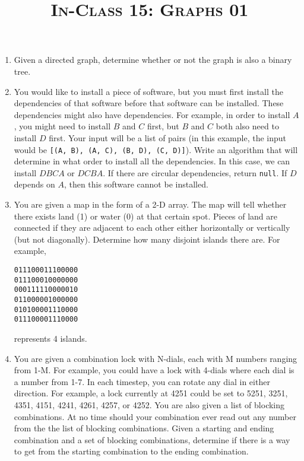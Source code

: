 \documentclass{article}
\title{\large{\textsc{In-Class 15: Graphs 01}}}
\date{}
\begin{document}
\maketitle

\subsection*{}

\begin{enumerate}

\item Given a directed graph, determine whether or not the graph is also a binary tree.

\item You would like to install a piece of software, but you must first install the dependencies of that software before that software can be installed. These dependencies might also have dependencies. For example, in order to install $A$, you might need to install $B$ and $C$ first, but $B$ and $C$ both also need to install $D$ first. Your input will be a list of pairs (in this example, the input would be \texttt{[(A, B), (A, C), (B, D), (C, D)]}). Write an algorithm that will determine in what order to install all the dependencies. In this case, we can install $DBCA$ or $DCBA$. If there are circular dependencies, return \texttt{null}. If $D$ depends on $A$, then this software cannot be installed.

\item You are given a map in the form of a 2-D array. The map will tell whether there exists land (1) or water (0) at that certain spot. Pieces of land are connected if they are adjacent to each other either horizontally or vertically (but not diagonally). Determine how many disjoint islands there are. For example,
\begin{lstlisting}
011100011100000
011100010000000
000111110000010
011000001000000
010100001110000
011100001110000
\end{lstlisting}
represents 4 islands.

\item You are given a combination lock with N-dials, each with M numbers ranging from 1-M. For example, you could have a lock with 4-dials where each dial is a number from 1-7. In each timestep, you can rotate any dial in either direction. For example, a lock currently at 4251 could be set to 5251, 3251, 4351, 4151, 4241, 4261, 4257, or 4252. You are also given a list of blocking combinations. At no time should your combination ever read out any number from the the list of blocking combinations. Given a starting and ending combination and a set of blocking combinations, determine if there is a way to get from the starting combination to the ending combination.
\end{enumerate}
\end{document}
